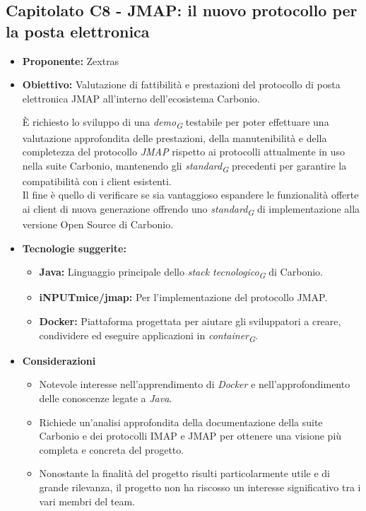 \documentclass{article}
\begin{document}
\subsection{\textbf{Capitolato C8} - JMAP: il nuovo protocollo per la posta elettronica}
\begin{itemize}
    \item[] \textbf{Proponente:} Zextras
    
    \item[] \textbf{Obiettivo:} Valutazione di fattibilità e prestazioni del protocollo di posta elettronica JMAP all'interno dell'ecosistema Carbonio.
    
    È richiesto lo sviluppo di una \textit{demo}\textsubscript{\textit{G}} testabile per poter effettuare una valutazione approfondita delle prestazioni, della manutenibilità e della completezza del protocollo \textit{JMAP} rispetto ai protocolli attualmente in uso nella suite Carbonio, mantenendo gli \textit{standard}\textsubscript{\textit{G}} precedenti per garantire la compatibilità con i client esistenti. \\
    Il fine è quello di verificare se sia vantaggioso espandere le funzionalità offerte ai client di nuova generazione offrendo uno \textit{standard}\textsubscript{\textit{G}} di implementazione alla versione Open Source di Carbonio.
    
    \item[] \textbf{Tecnologie suggerite:} 
    \begin{itemize}
        \item \textbf{Java:} Linguaggio principale dello \textit{stack tecnologico}\textsubscript{\textit{G}} di Carbonio.
        \item \textbf{iNPUTmice/jmap:} Per l’implementazione del protocollo JMAP.
        \item \textbf{Docker:} Piattaforma progettata per aiutare gli sviluppatori a creare, condividere ed eseguire applicazioni in \textit{container}\textsubscript{\textit{G}}.
    \end{itemize}
    
    \item[] \textbf{Considerazioni}
    \begin{itemize}
        \item Notevole interesse nell'apprendimento di \textit{Docker} e nell'approfondimento delle conoscenze legate a \textit{Java}.
        \item Richiede un'analisi approfondita della documentazione della suite Carbonio e dei protocolli IMAP e JMAP per ottenere una visione più completa e concreta del progetto.
        \item Nonostante la finalità del progetto risulti particolarmente utile e di grande rilevanza, il progetto non ha riscosso un interesse significativo tra i vari membri del team.
    \end{itemize} 

\end{itemize}
\pagebreak
\end{document}

